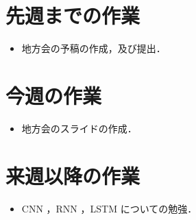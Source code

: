 \section{先週までの作業}
\begin{itemize}
\item 地方会の予稿の作成，及び提出．       
\end{itemize}

\section{今週の作業}
\begin{itemize}
\item 地方会のスライドの作成．
\end{itemize}

\section{来週以降の作業}
\begin{itemize}
          \item CNN ，RNN ，LSTM についての勉強．
\end{itemize}





